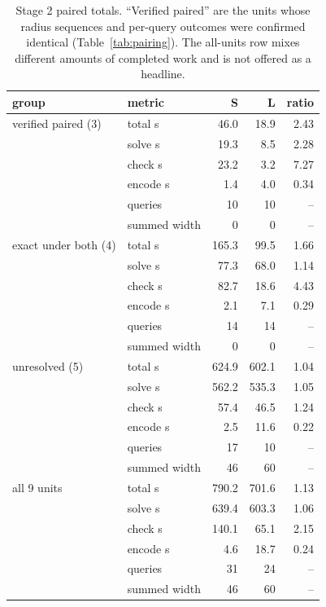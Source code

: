 \begin{table}[htbp]
\centering
\begin{tabular}{llrrr}
\toprule
group & metric & S & L & ratio \\
\midrule
verified paired (3) & total s & 46.0 & 18.9 & 2.43 \\
 & solve s & 19.3 & 8.5 & 2.28 \\
 & check s & 23.2 & 3.2 & 7.27 \\
 & encode s & 1.4 & 4.0 & 0.34 \\
 & queries & 10 & 10 & -- \\
 & summed width & 0 & 0 & -- \\
\midrule
exact under both (4) & total s & 165.3 & 99.5 & 1.66 \\
 & solve s & 77.3 & 68.0 & 1.14 \\
 & check s & 82.7 & 18.6 & 4.43 \\
 & encode s & 2.1 & 7.1 & 0.29 \\
 & queries & 14 & 14 & -- \\
 & summed width & 0 & 0 & -- \\
\midrule
unresolved (5) & total s & 624.9 & 602.1 & 1.04 \\
 & solve s & 562.2 & 535.3 & 1.05 \\
 & check s & 57.4 & 46.5 & 1.24 \\
 & encode s & 2.5 & 11.6 & 0.22 \\
 & queries & 17 & 10 & -- \\
 & summed width & 46 & 60 & -- \\
\midrule
all 9 units & total s & 790.2 & 701.6 & 1.13 \\
 & solve s & 639.4 & 603.3 & 1.06 \\
 & check s & 140.1 & 65.1 & 2.15 \\
 & encode s & 4.6 & 18.7 & 0.24 \\
 & queries & 31 & 24 & -- \\
 & summed width & 46 & 60 & -- \\
\midrule
\bottomrule
\end{tabular}
\caption{Stage 2 paired totals. ``Verified paired'' are the units whose radius sequences and per-query outcomes were confirmed identical (Table~\ref{tab:pairing}). The all-units row mixes different amounts of completed work and is not offered as a headline.}
\label{tab:totals}
\end{table}

